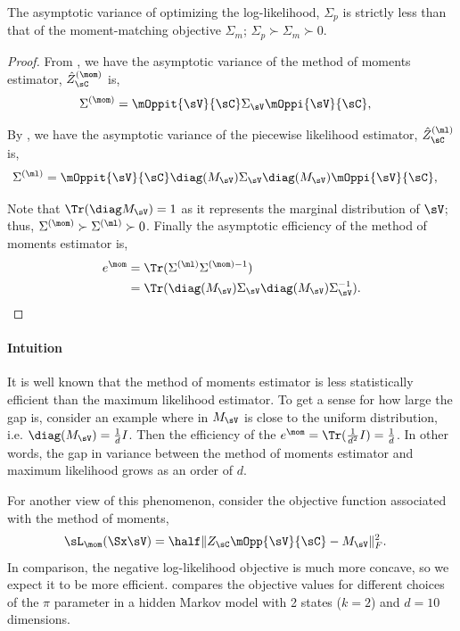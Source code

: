 \begin{corollary}
  The asymptotic variance of optimizing the log-likelihood, $\Sigma_p$
  is strictly less than that of the moment-matching objective
  $\Sigma_m$; $\Sigma_p \succ \Sigma_m \succ 0$.
\end{corollary}
\begin{proof}
  From , we have the asymptotic variance of the method of moments estimator, $\hat Z_\sC^{(\mom)}$ is,
  \begin{align*}
    \Sigma^{(\mom)} &= \mOppit{\sV}{\sC} \Sigma_\sV \mOppi{\sV}{\sC},
  \end{align*}

  By , we have the asymptotic variance of the piecewise likelihood estimator, $\hat Z_\sC^{(\ml)}$ is,
  \begin{align*}
    \Sigma^{(\ml)} &= \mOppit{\sV}{\sC} \diag(M_\sV) \Sigma_\sV \diag(M_\sV) \mOppi{\sV}{\sC},
  \end{align*}

  Note that $\Tr(\diag M_\sV) = 1$ as it represents the marginal
  distribution of $\sV$; thus, $\Sigma^{(\mom)} \succ \Sigma^{(\ml)}
  \succ 0$.  Finally the asymptotic efficiency of the method of moments
  estimator is, 
  \begin{align*}
    e^\mom &= \Tr( \Sigma^{(\ml)}\Sigma^{(\mom) -1} )  \\
           &= \Tr( \diag(M_\sV) \Sigma_\sV \diag(M_\sV) \Sigma_\sV^{-1} ).
  \end{align*}
\end{proof}

\paragraph{Intuition}
It is well known that the method of moments estimator is less
  statistically efficient than the maximum likelihood estimator. 
To get a sense for how large the gap is, consider an example where in
  $M_\sV$ is close to the uniform distribution, i.e. $\diag(M_\sV)
  = \frac{1}{d} I$. 
Then the efficiency of the $e^\mom = \Tr(\frac{1}{d^2} I)
  = \frac{1}{d}$.
In other words, the gap in variance between the method of moments
  estimator and maximum likelihood grows as an order of $d$.

For another view of this phenomenon, consider the objective function
  associated with the method of moments, 
\begin{align*}
  \sL_\mom(\Sx \sV) &= \half \|Z_\sC \mOpp{\sV}{\sC} - M_\sV \|_F^2.
\end{align*}
In comparison, the negative log-likelihood objective is much more
concave, so we expect it to be more efficient. 
 compares the objective values for
different choices of the $\pi$ parameter in a hidden Markov model
 with 2 states ($k=2$) and $d=10$ dimensions.

